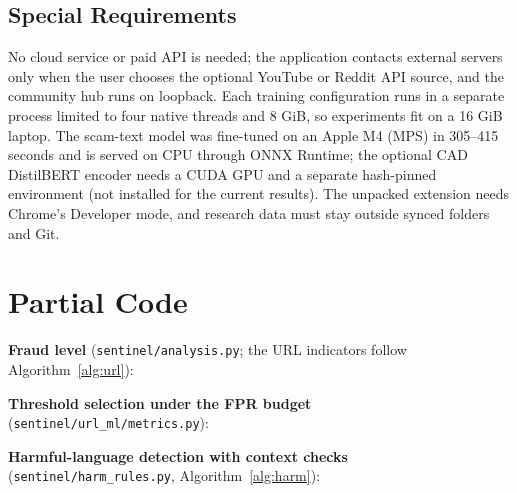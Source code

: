 \subsection{Special Requirements}
\noindent No cloud service or paid API is needed; the application contacts external servers only when the user chooses the optional YouTube or Reddit API source, and the community hub runs on loopback. Each training configuration runs in a separate process limited to four native threads and 8 GiB, so experiments fit on a 16 GiB laptop. The scam-text model was fine-tuned on an Apple M4 (MPS) in 305--415 seconds and is served on CPU through ONNX Runtime; the optional CAD DistilBERT encoder needs a CUDA GPU and a separate hash-pinned environment (not installed for the current results). The unpacked extension needs Chrome's Developer mode, and research data must stay outside synced folders and Git.

\section{Partial Code}
\noindent\textbf{Fraud level} (\texttt{sentinel/analysis.py}; the URL indicators follow Algorithm~\ref{alg:url}):


\noindent\textbf{Threshold selection under the FPR budget} (\texttt{sentinel/url\_ml/metrics.py}):


\noindent\textbf{Harmful-language detection with context checks} (\texttt{sentinel/harm\_rules.py}, Algorithm~\ref{alg:harm}):

